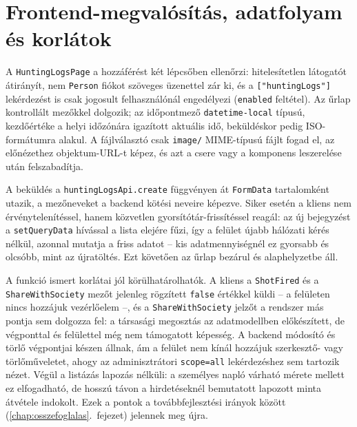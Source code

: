 \section{Frontend-megvalósítás, adatfolyam és korlátok}
\label{sec:log-frontend}

A \texttt{HuntingLogsPage} a hozzáférést két lépcsőben ellenőrzi: hitelesítetlen látogatót
átirányít, nem \texttt{Person} fiókot szöveges üzenettel zár ki, és a \texttt{["huntingLogs"]}
lekérdezést is csak jogosult felhasználónál engedélyezi (\texttt{enabled} feltétel). Az űrlap
kontrollált mezőkkel dolgozik; az időpontmező \texttt{datetime-local} típusú, kezdőértéke a
helyi időzónára igazított aktuális idő, beküldéskor pedig ISO-formátumra alakul. A fájlválasztó
csak \texttt{image/} MIME-típusú fájlt fogad el, az előnézethez objektum-URL-t képez, és azt a
csere vagy a komponens leszerelése után felszabadítja.

A beküldés a \texttt{huntingLogsApi.create} függvényen át \texttt{FormData} tartalomként utazik,
a mezőneveket a backend kötési neveire képezve. Siker esetén a kliens nem érvénytelenítéssel,
hanem közvetlen gyorsítótár-frissítéssel reagál: az új bejegyzést a \texttt{setQueryData}
hívással a lista elejére fűzi, így a felület újabb hálózati kérés nélkül, azonnal mutatja a
friss adatot -- kis adatmennyiségnél ez gyorsabb és olcsóbb, mint az újratöltés. Ezt követően az
űrlap bezárul és alaphelyzetbe áll.

A funkció ismert korlátai jól körülhatárolhatók. A kliens a \texttt{ShotFired} és a
\texttt{ShareWithSociety} mezőt jelenleg rögzített \texttt{false} értékkel küldi -- a felületen
nincs hozzájuk vezérlőelem --, és a \texttt{ShareWithSociety} jelzőt a rendszer más pontja sem
dolgozza fel: a társasági megosztás az adatmodellben előkészített, de végponttal és felülettel még
nem támogatott képesség. A backend módosító és törlő végpontjai készen állnak, ám a felület nem
kínál hozzájuk szerkesztő- vagy törlőműveletet, ahogy az adminisztrátori \texttt{scope=all}
lekérdezéshez sem tartozik nézet. Végül a listázás lapozás nélküli: a személyes napló várható
mérete mellett ez elfogadható, de hosszú távon a hirdetéseknél bemutatott lapozott minta
átvétele indokolt. Ezek a pontok a továbbfejlesztési irányok között
(\ref{chap:osszefoglalas}.~fejezet) jelennek meg újra.
